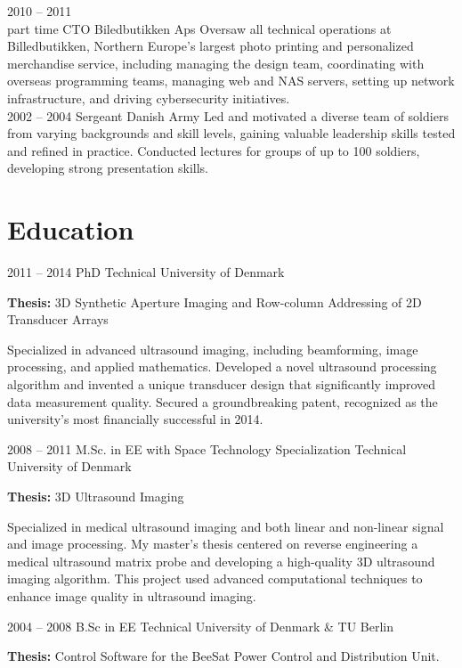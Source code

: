 \documentclass[8pt]{mofiicv}
\begin{document}
\begin{minipage}[T]{\SecondColumnWidth}
\begin{entrylist}
			{2010 -- 2011\\\footnotesize{part time}}
			{CTO}
			{Biledbutikken Aps}
			{
			Oversaw all technical operations at Billedbutikken, Northern Europe's largest photo printing and personalized merchandise service, including managing the design team, coordinating with overseas programming teams, managing web and NAS servers, setting up network infrastructure, and driving cybersecurity initiatives.\\
			}
		\entry
			{2002 -- 2004}
			{Sergeant}
			{Danish Army}
			{
			Led and motivated a diverse team of soldiers from varying backgrounds and skill levels, gaining valuable leadership skills tested and refined in practice. Conducted lectures for groups of up to 100 soldiers, developing strong presentation skills.\\ 
			}
	\end{entrylist}

	\section{Education}
	\begin{entrylist}
		\entry
			{2011 -- 2014}
			{PhD}
			{Technical University of Denmark}
			{\textbf{Thesis:} 3D Synthetic Aperture Imaging and Row-column Addressing of 2D Transducer Arrays

			Specialized in advanced ultrasound imaging, including beamforming, image processing, and applied mathematics. Developed a novel ultrasound processing algorithm and invented a unique transducer design that significantly improved data measurement quality. Secured a groundbreaking patent, recognized as the university's most financially successful in 2014.}
		\entry
			{2008 -- 2011}
			{M.Sc. in EE with Space Technology Specialization}
			{Technical University of Denmark}
			{\textbf{Thesis:} 3D Ultrasound Imaging

			Specialized in medical ultrasound imaging and both linear and non-linear signal and image processing. My master's thesis centered on reverse engineering a medical ultrasound matrix probe and developing a high-quality 3D ultrasound imaging algorithm. 
			This project used advanced computational techniques to enhance image quality in ultrasound imaging.}
		\entry
			{2004 -- 2008}
			{B.Sc in EE}
			{Technical University of Denmark \& TU Berlin} 
			{\textbf{Thesis:} Control Software for the BeeSat Power Control and Distribution Unit.

}
\end{entrylist}
\end{minipage}
\end{document}
